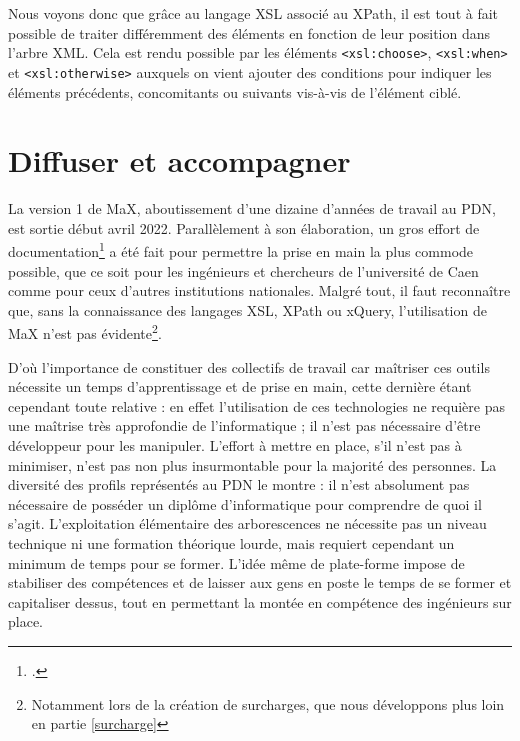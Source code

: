 \documentclass[a4paper,12pt,twoside]{book}
\begin{document}
    Nous voyons donc que grâce au langage \acrshort{XSL} associé au XPath, il est tout à fait possible de traiter différemment des éléments en fonction de leur position dans l'arbre XML. Cela est rendu possible par les éléments \texttt{<xsl:choose>}, \texttt{<xsl:when>} et \texttt{<xsl:otherwise>} auxquels on vient ajouter des conditions pour indiquer les éléments précédents, concomitants ou suivants vis-à-vis de l'élément ciblé.
    
    
\section{Diffuser et accompagner}
    La version 1 de MaX, aboutissement d'une dizaine d'années de travail au \acrshort{PDN}, est sortie début avril 2022. Parallèlement à son élaboration, un gros effort de documentation\footcite{MaX} a été fait pour permettre la prise en main la plus commode possible, que ce soit pour les ingénieurs et chercheurs de l'université de Caen comme pour ceux d'autres institutions nationales. Malgré tout, il faut reconnaître que, sans la connaissance des langages \acrshort{XSL}, XPath ou xQuery, l'utilisation de MaX n'est pas évidente\footnote{Notamment lors de la création de surcharges, que nous développons plus loin en partie \ref{surcharge}}.
    
   D’où l’importance de constituer des collectifs de travail car maîtriser ces outils nécessite un temps d'apprentissage et de prise en main, cette dernière étant cependant toute relative : en effet l'utilisation de ces technologies ne requière pas une maîtrise très approfondie de l'informatique ; il n'est pas nécessaire d'être développeur pour les manipuler. L'effort à mettre en place, s'il n'est pas à minimiser, n'est pas non plus insurmontable pour la majorité des personnes. La diversité des profils représentés au \acrshort{PDN} le montre : il n'est absolument pas nécessaire de posséder un diplôme d'informatique pour comprendre de quoi il s'agit. L'exploitation élémentaire des arborescences ne nécessite pas un niveau technique ni une formation théorique lourde, mais requiert cependant un minimum de temps pour se former. L'idée même de plate-forme impose de stabiliser des compétences et de laisser aux gens en poste le temps de se former et capitaliser dessus, tout en permettant la montée en compétence des ingénieurs sur place.
    
\end{document}
